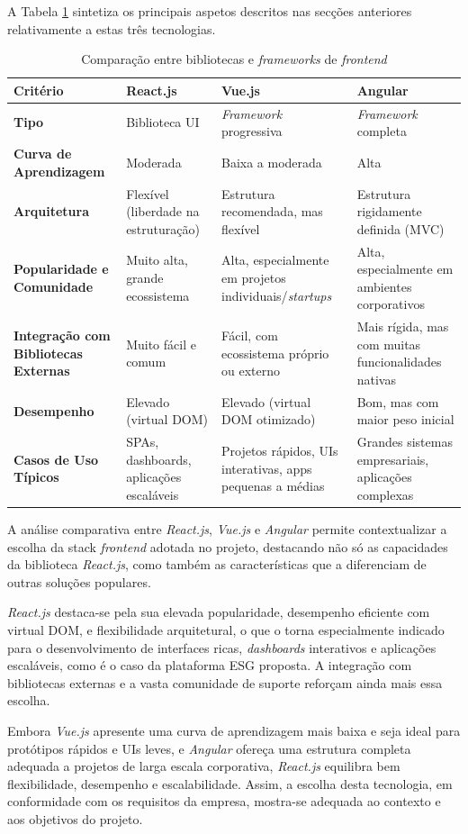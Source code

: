 A Tabela \ref{tab:comparacao_frontend} sintetiza os principais aspetos descritos nas secções anteriores relativamente a estas três tecnologias.

\begin{table}[H]
\centering
\begin{tabular}{|p{3cm}|p{3.3cm}|p{3.3cm}|p{3.3cm}|}
\hline
\textbf{Critério} & \textbf{React.js} & \textbf{Vue.js} & \textbf{Angular} \\
\hline
\textbf{Tipo} & Biblioteca UI & \textit{Framework} progressiva & \textit{Framework} completa \\
\hline
\textbf{Curva de Aprendizagem} & Moderada & Baixa a moderada & Alta \\
\hline
\textbf{Arquitetura} & Flexível (liberdade na estruturação) & Estrutura recomendada, mas flexível & Estrutura rigidamente definida (MVC) \\
\hline
\textbf{Popularidade e Comunidade} & Muito alta, grande ecossistema & Alta, especialmente em projetos individuais/\textit{startups} & Alta, especialmente em ambientes corporativos \\
\hline
\textbf{Integração com Bibliotecas Externas} & Muito fácil e comum & Fácil, com ecossistema próprio ou externo & Mais rígida, mas com muitas funcionalidades nativas \\
\hline
\textbf{Desempenho} & Elevado (virtual DOM) & Elevado (virtual DOM otimizado) & Bom, mas com maior peso inicial \\
\hline
\textbf{Casos de Uso Típicos} & SPAs, dashboards, aplicações escaláveis & Projetos rápidos, UIs interativas, apps pequenas a médias & Grandes sistemas empresariais, aplicações complexas \\
\hline
\end{tabular}
\caption{Comparação entre bibliotecas e \textit{frameworks} de \textit{frontend}}
\label{tab:comparacao_frontend}
\end{table}

A análise comparativa entre \textit{React.js}, \textit{Vue.js} e \textit{Angular} permite contextualizar a escolha da stack \textit{frontend} adotada no projeto, destacando não só as capacidades da biblioteca \textit{React.js}, como também as características que a diferenciam de outras soluções populares.

\textit{React.js} destaca-se pela sua elevada popularidade, desempenho eficiente com virtual DOM, e flexibilidade arquitetural, o que o torna especialmente indicado para o desenvolvimento de interfaces ricas, \textit{dashboards} interativos e aplicações escaláveis, como é o caso da plataforma ESG proposta. A integração com bibliotecas externas e a vasta comunidade de suporte reforçam ainda mais essa escolha.

Embora \textit{Vue.js} apresente uma curva de aprendizagem mais baixa e seja ideal para protótipos rápidos e UIs leves, e \textit{Angular} ofereça uma estrutura completa adequada a projetos de larga escala corporativa, \textit{React.js} equilibra bem flexibilidade, desempenho e escalabilidade. Assim, a escolha desta tecnologia, em conformidade com os requisitos da empresa, mostra-se adequada ao contexto e aos objetivos do projeto.


 \vspace{20mm}
